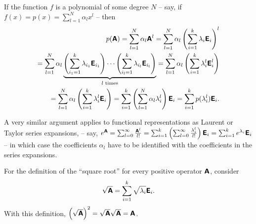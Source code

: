 {
\color{blue}
\bexample
If the function $f$ is a polynomial of some degree $N$ -- say, if
$f (x) = p(x) = \sum_{l=1}^N \alpha_l x^l$ -- then
\begin{equation}
\begin{split}
p (\textsf{\textbf{A}})
= \sum_{l=1}^N \alpha_l \textsf{\textbf{A}}^l
= \sum_{l=1}^N \alpha_l \left(\sum_{i=1}^k  \lambda_i   \textsf{\textbf{E}}_i\right)^l \\
= \sum_{l=1}^N \alpha_l \underbrace{\left(\sum_{{i_1}=1}^k \lambda_{i_1}  \textsf{\textbf{E}}_{i_1}\right)   \cdots  \left(\sum_{{i_l}=1}^k \lambda_{i_l}  \textsf{\textbf{E}}_{i_l}\right)}_{l \text{ times}}
= \sum_{l=1}^N \alpha_l \left(\sum_{i=1}^k  \lambda_i^l   \textsf{\textbf{E}}_i^l\right)   \\
= \sum_{l=1}^N \alpha_l \left(\sum_{i=1}^k  \lambda_i^l   \textsf{\textbf{E}}_i\right)
= \sum_{i=1}^k    \left( \sum_{l=1}^N \alpha_l \lambda_i^l   \right)  \textsf{\textbf{E}}_i
= \sum_{i=1}^k p ( \lambda_i^l   ) \textsf{\textbf{E}}_i  .
\end{split}
\end{equation}

A very similar argument applies to functional representations as Laurent or Taylor series expansions,
 -- say, $e^\textsf{\textbf{A}} = \sum_{l=0}^\infty   \frac{\textsf{\textbf{A}}^l}{l!} = \sum_{i=1}^k  \left(   \sum_{l=0}^\infty \frac{\lambda_i^l}{l!}\right) \textsf{\textbf{E}}_i
= \sum_{i=1}^k  e^{\lambda_i} \textsf{\textbf{E}}_i $
-- in which case the coefficients $\alpha_l $ have to be identified with the coefficients in the  series expansions.


For the definition of the ``square root''
for every positive operator $\textsf{\textbf{A}}$, consider
\begin{equation}
\sqrt{\textsf{\textbf{A}}}=\sum_{i=1}^k \sqrt{\lambda_i}  \textsf{\textbf{E}}_i.
\end{equation}
With this definition,
$\left(\sqrt{\textsf{\textbf{A}}}\right)^2=
\sqrt{\textsf{\textbf{A}}}\sqrt{\textsf{\textbf{A}}}= {\textsf{\textbf{A}}}$.

}
